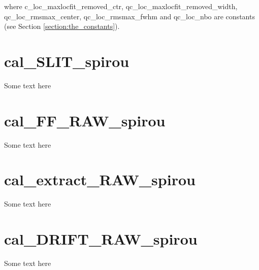 \noindent where c\_loc\_maxlocfit\_removed\_ctr, qc\_loc\_maxlocfit\_removed\_width, qc\_loc\_rmsmax\_center, qc\_loc\_rmsmax\_fwhm and qc\_loc\_nbo are constants (see Section \ref{section:the_constants}).

\section{cal\_SLIT\_spirou}
\label{section:qc_cal_SLIT_spirou}

Some text here

\section{cal\_FF\_RAW\_spirou}
\label{section:qc_cal_FF_RAW_spirou}

Some text here

\section{cal\_extract\_RAW\_spirou}
\label{section:qc_cal_extract_RAW_spirou}

Some text here

\section{cal\_DRIFT\_RAW\_spirou}
\label{section:qc_cal_DRIFT_RAW_spirou}

Some text here